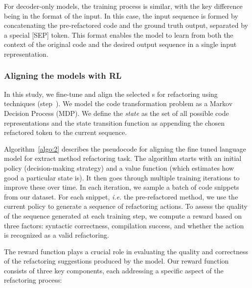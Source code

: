 For decoder-only models, the training process is similar, with the key difference being in the format of the input. In this case, the input sequence is formed by concatenating the pre-refactored code and the ground truth output, separated by a special \textsc{[SEP]} token. This format enables the model to learn from both the context of the original code and the desired output sequence in a single input representation.


\subsubsection{Aligning the models with RL}

In this study, we fine-tune and align the selected \llm{}s for \exm{} refactoring using \rl{} techniques (step~). 
We model the code transformation problem as a Markov Decision Process (MDP).
We define the \textit{state} as the set of all possible code representations and the state transition function as appending the chosen refactored token to the current sequence.

Algorithm~\ref{algo:2} describes the pseudocode for aligning the fine tuned language model for extract method refactoring task. The algorithm starts with an initial policy (decision-making strategy) and a value function (which estimates how good a particular state is). It then goes through multiple training iterations to improve these over time. In each iteration, we sample a batch of code snippets from our \rl{} dataset. For each snippet, \textit{i.e.} the pre-refactored method, we use the current policy to generate a sequence of refactoring actions. To assess the quality of the sequence generated at each training step, we compute a reward based on three factors: syntactic correctness, compilation success, and whether the action is recognized as a valid refactoring. 



The reward function plays a crucial role in evaluating the quality and correctness of the refactoring suggestions produced by the model.
Our reward function consists of three key components, each addressing a specific aspect of the refactoring process:

